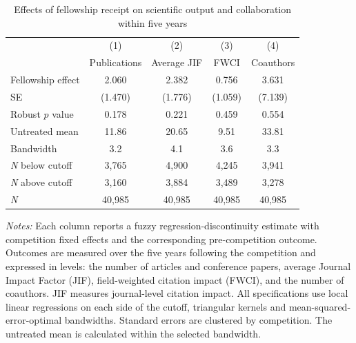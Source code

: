 \begin{table}[!t]
\centering
\begin{minipage}{0.90\textwidth}
\caption{Effects of fellowship receipt on scientific output and collaboration within five years}
\label{tab:research_second_specifications}
\footnotesize
\setlength{\tabcolsep}{4pt}
\renewcommand{\arraystretch}{1.05}
\begin{tabular*}{\linewidth}{@{\extracolsep{\fill}}lcccc@{}}
\toprule
& (1) & (2) & (3) & (4) \\
& Publications & Average JIF & FWCI & Coauthors \\
\midrule
Fellowship effect & 2.060 & 2.382 & 0.756 & 3.631 \\
SE & (1.470) & (1.776) & (1.059) & (7.139) \\
\midrule
Robust $p$ value & 0.178 & 0.221 & 0.459 & 0.554 \\
Untreated mean & 11.86 & 20.65 & 9.51 & 33.81 \\
Bandwidth & 3.2 & 4.1 & 3.6 & 3.3 \\
\textit{N} below cutoff & 3,765 & 4,900 & 4,245 & 3,941 \\
\textit{N} above cutoff & 3,160 & 3,884 & 3,489 & 3,278 \\
\textit{N} & 40,985 & 40,985 & 40,985 & 40,985 \\
\bottomrule
\end{tabular*}
\par\smallskip
\begin{minipage}{\linewidth}
\scriptsize
\textit{Notes:} Each column reports a fuzzy regression-discontinuity estimate with competition fixed effects and the corresponding pre-competition outcome. Outcomes are measured over the five years following the competition and expressed in levels: the number of articles and conference papers, average Journal Impact Factor (JIF), field-weighted citation impact (FWCI), and the number of coauthors. JIF measures journal-level citation impact. All specifications use local linear regressions on each side of the cutoff, triangular kernels and mean-squared-error-optimal bandwidths. Standard errors are clustered by competition. The untreated mean is calculated within the selected bandwidth.
\end{minipage}
\end{minipage}
\end{table}

